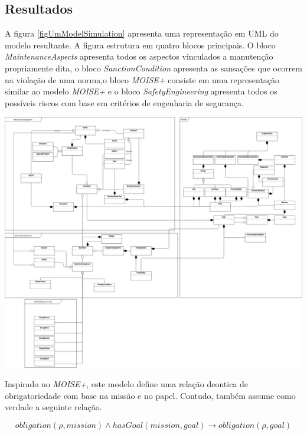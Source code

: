 \documentclass[a0,portrait]{a0poster}
\begin{document}
\begin{multicols}{2}
\section*{Resultados}

A figura \ref{figUmModelSimulation} apresenta uma representação em UML do modelo resultante. A figura estrutura em 
quatro blocos principais. O bloco \textit{MaintenanceAspects} apresenta todos os aspectos vinculados a manutenção 
propriamente dita, o bloco \textit{SanctionCondition} apresenta as sansações que ocorrem na violação de uma norma,o 
bloco \textit{MOISE+} consiste em uma representação similar ao modelo \textit{MOISE+} e o bloco \textit{SafetyEngineering}
apresenta todos os possíveis riscos com base em critérios de engenharia de segurança.

\begin{center}\vspace{1cm} 
	\label{figUmlModelSimulation}
	\includegraphics[width=1\linewidth]{uml_model_simulation}
\end{center}\vspace{1cm} 



Inspirado no \textit{MOISE+}, este modelo define uma relação deontica de obrigatoriedade com base na missão e no papel. 
Contudo, também assume como verdade a seguinte relação. 

\begin{equation}\label{deontilogic}
	obligation(\rho,mission)\wedge hasGoal(mission,goal) \to obligation(\rho,goal)
\end{equation}


\end{multicols}
\end{document}
